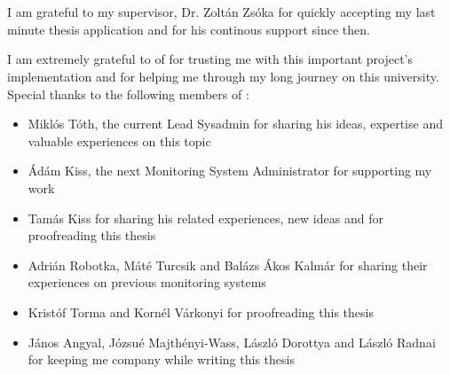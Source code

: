 \chapter*{\koszonetnyilvanitas}

I am grateful to my supervisor, Dr. Zoltán Zsóka for quickly accepting my last
minute thesis application and for his continous support since then.

I am extremely grateful to \kszkfull of \schfull for trusting me with this
important project's implementation and for helping me through my long journey
on this university. Special thanks to the following members of \kszk:
\begin{itemize}
	\item Miklós Tóth, the current Lead Sysadmin for sharing his ideas, expertise and valuable experiences on this topic
	\item Ádám Kiss, the next Monitoring System Administrator for supporting my work
	\item Tamás Kiss for sharing his related experiences, new ideas and for proofreading this thesis
	\item Adrián Robotka, Máté Turcsik and Balázs Ákos Kalmár for sharing their experiences on previous monitoring systems
	\item Kristóf Torma and Kornél Várkonyi for proofreading this thesis
	\item János Angyal, Józsué Majthényi-Wass, László Dorottya and László Radnai for keeping me company while writing this thesis
\end{itemize}












